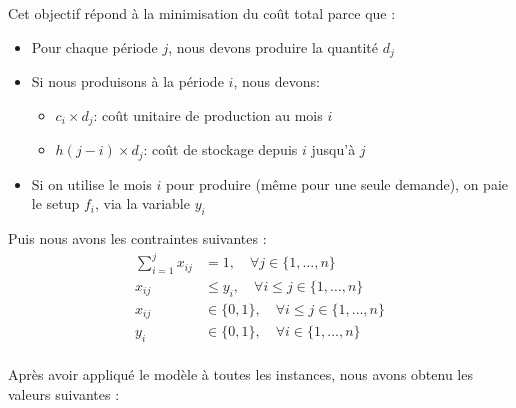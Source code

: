 \documentclass[a4paper,12pt]{article}
\theoremstyle{blueDefinition}
\theoremstyle{redProperty}
\begin{document}
Cet objectif répond à la minimisation du coût total parce que :
\begin{itemize}
    \item Pour chaque période $j$, nous devons produire la quantité $d_j$
    \item Si nous produisons à la période $i$, nous devons: \begin{itemize}
        \item $c_i \times d_j$: coût unitaire de production au mois $i$
        \item $h( j - i ) \times d_j$: coût de stockage depuis $i$ jusqu'à $j$
    \end{itemize}
    \item Si on utilise le mois $i$ pour produire (même pour une seule demande), on paie le setup $f_i$, via la variable $y_i$
\end{itemize}

\vspace{10pt}

Puis nous avons les contraintes suivantes :
\begin{align}
    \sum_{i=1}^{j} x_{ij} &= 1, \quad \forall j \in \{1, \dots, n\}  \\
    x_{ij} &\leq y_i, \quad \forall i \leq j \in \{1, \dots, n\} \\
    x_{ij} &\in \{0, 1\}, \quad \forall i \leq j \in \{1, \dots, n\} \\
    y_i &\in \{0, 1\}, \quad \forall i \in \{1, \dots, n\} \\
\end{align}


Après avoir appliqué le modèle à toutes les instances, nous avons obtenu les valeurs suivantes :
\end{document}
